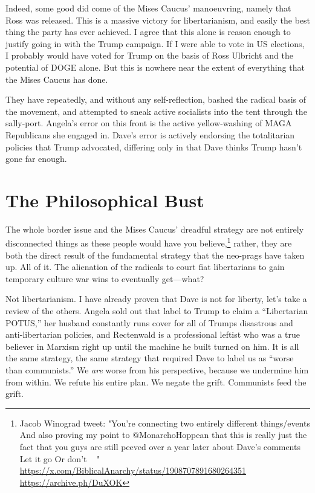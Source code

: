 \documentclass[11pt]{article}
\begin{document}
Indeed, some good did come of the Mises Caucus' manoeuvring, namely that Ross was released. This is a massive victory for libertarianism, and easily the best thing the party has ever achieved. I agree that this alone is reason enough to justify going in with the Trump campaign. If I were able to vote in US elections, I probably would have voted for Trump on the basis of Ross Ulbricht and the potential of DOGE alone. But this is nowhere near the extent of everything that the Mises Caucus has done.

They have repeatedly, and without any self-reflection, bashed the radical basis of the movement, and attempted to sneak active socialists into the tent through the sally-port. Angela's error on this front is the active yellow-washing of MAGA Republicans she engaged in. Dave's error is actively endorsing the totalitarian policies that Trump advocated, differing only in that Dave thinks Trump hasn't gone far enough.
\section{The Philosophical Bust}
\label{sec:org9e07e94}
The whole border issue and the Mises Caucus' dreadful strategy are not entirely disconnected things as these people would have you believe,\footnote{Jacob Winograd tweet: "You're connecting two entirely different things/events
And also proving my point to @MonarchoHoppean that this is really just the fact that you guys are still peeved over a year later about Dave's comments
Let it go
Or don't 🤷🏻‍♂️" \url{https://x.com/BiblicalAnarchy/status/1908707891680264351} \url{https://archive.ph/DuXOK}} rather, they are both the direct result of the fundamental strategy that the neo-prags have taken up. All of it. The alienation of the radicals to court fiat libertarians to gain temporary culture war wins to eventually get---what?

Not libertarianism. I have already proven that Dave is not for liberty, let's take a review of the others. Angela sold out that label to Trump to claim a ``Libertarian POTUS,'' her husband constantly runs cover for all of Trumps disastrous and anti-libertarian policies, and Rectenwald is a professional leftist who was a true believer in Marxism right up until the machine he built turned on him. It is all the same strategy, the same strategy that required Dave to label us as ``worse than communists.'' We \emph{are} worse from his perspective, because we undermine him from within. We refute his entire plan. We negate the grift. Communists feed the grift.
\end{document}

